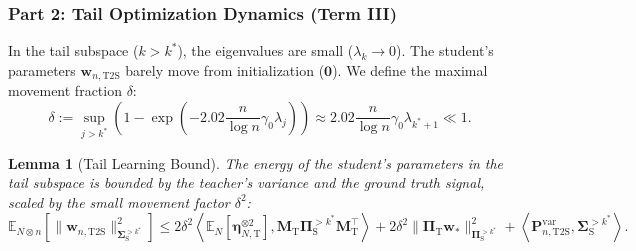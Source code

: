 \documentclass{article}
\theoremstyle{definition}
\theoremstyle{definition}
\theoremstyle{plain}
\theoremstyle{plain}
\theoremstyle{plain}
\newtheorem{lemma}{Lemma}
\theoremstyle{plain}
\theoremstyle{plain}
\newcommand{\bs}[1]{\boldsymbol{\mathbf{#1}}}
\newcommand{\te}{\mathrm{T}}
\newcommand{\st}{\mathrm{S}}
\newcommand{\ts}{\mathrm{T2S}}
\newcommand{\M}{\mathbf{M}}
\newcommand{\Sig}{\mathbf{\Sigma}}
\newcommand{\w}{\mathbf{w}}
\newcommand{\ex}[2][]{\mathbb{E}_{#1}\left[ #2 \right]}
\newcommand{\inner}[1]{\left\langle#1\right\rangle}
\begin{document}
\subsubsection*{Part 2: Tail Optimization Dynamics (Term III)}

In the tail subspace ($k > k^*$), the eigenvalues are small ($\lambda_k \to 0$). The student's parameters $\w_{n,\ts}$ barely move from initialization ($\mathbf{0}$). We define the maximal movement fraction $\delta$:
\begin{equation}
    \delta := \sup_{j > k^*} \left( 1 - \exp\left( -2.02 \frac{n}{\log n} \gamma_0 \lambda_j \right) \right) \approx 2.02 \frac{n}{\log n} \gamma_0 \lambda_{k^*+1} \ll 1.
\end{equation}

\begin{lemma}[Tail Learning Bound]
    The energy of the student's parameters in the tail subspace is bounded by the teacher's variance and the ground truth signal, scaled by the small movement factor $\delta^2$:
    \begin{equation}
        \ex[N\otimes n]{\|\w_{n,\ts}\|_{\Sig_\st^{> k^*}}^2} \leq 2\delta^2 \inner{\ex[N]{\bs\eta_{N,\te}^{\otimes 2}}, \M_\te \bs \Pi_\st^{> k^*} \M_\te^\top} + 2\delta^2 \|\bs \Pi_\te \w_*\|_{\bs \Pi_\st^{> k^*}}^2 + \inner{\bs P^{\mathrm{var}}_{n,\ts}, \Sig_\st^{> k^*}}.
    \end{equation}
\end{lemma}
\end{document}

